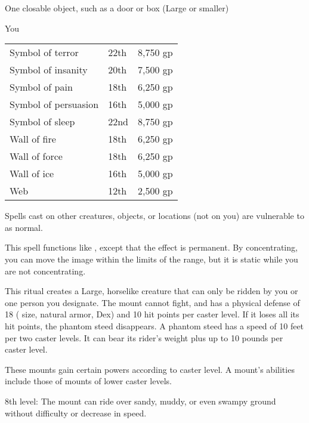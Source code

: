 \begin{spelltarget}{One closable object, such as a door or box (Large or smaller)}
\begin{spelltarget}{You}
\begin{dtable}
\begin{tabularx}{\columnwidth}{>{\lcol}X >{\lcol}X l}
        Symbol of terror & 22th & 8,750 gp \\
        Symbol of insanity & 20th & 7,500 gp \\
        Symbol of pain & 18th & 6,250 gp \\
        Symbol of persuasion & 16th & 5,000 gp \\
        Symbol of sleep & 22nd & 8,750 gp \\
        Wall of fire & 18th & 6,250 gp \\
        Wall of force & 18th & 6,250 gp \\
        Wall of ice & 16th & 5,000 gp \\
        Web & 12th & 2,500 gp
    \end{tabularx}
\end{dtable}
\spellnotes Spells cast on other creatures, objects, or locations (not on you) are vulnerable to  as normal.

\spelleffect This spell functions like , except that the effect is permanent. By concentrating, you can move the image within the limits of the range, but it is static while you are not concentrating.

\spelldur{\durext \dismissable}
\spelleffect This ritual creates a Large, horselike creature that can only be ridden by you or one person you designate. The mount cannot fight, and has a physical defense of 18 ( size,  natural armor,  Dex) and 10 hit points  per caster level. If it loses all its hit points, the phantom steed disappears. A phantom steed has a speed of 10 feet per two caster levels. It can bear its rider's weight plus up to 10 pounds per caster level.
\par These mounts gain certain powers according to caster level. A mount's abilities include those of mounts of lower caster levels. 
\par 8th level: The mount can ride over sandy, muddy, or even swampy ground without difficulty or decrease in speed.


\end{spelltarget}
\end{spelltarget}
